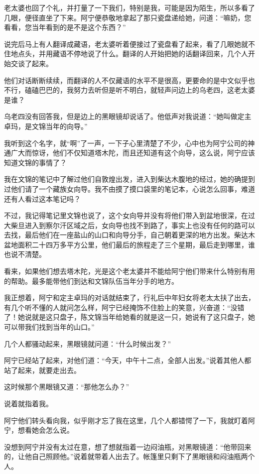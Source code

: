老太婆也回了个礼，并打量了一下我们，特别是我，可能是因为陌生，所以多看了几眼，便径直坐了下来。阿宁便恭敬地拿起了那只瓷盘递给她，问道：“嘛奶，您看看，您当年看到的是不是这个东西？”

说完后马上有人翻译成藏语，老太婆听着便接过了瓷盘看了起来，看了几眼她就不住地点头，并用藏语不停地说了什么。翻译的人开始把她的话翻译回来，几个人开始交谈了起来。

他们对话断断续续，而翻译的人不仅藏语的水平不是很高，更要命的是中文似乎也不行，磕磕巴巴的，我努力去听但是听不明白，就轻声问边上的乌老四，这老太婆是谁？

乌老四没有回答我，但是边上的黑眼镜却说话了。他低声对我说道：“她叫做定主卓玛，是文锦当年的向导。”

我听到这个名字，就“啊”了一声，一下子心里清楚了不少，心中也为阿宁公司的神通广大而惊讶，他们不仅知道塔木陀，而且还知道有这个向导，这么说，阿宁应该知道文锦的事情了？

我在文锦的笔记中了解过他们自敦煌出发，进入到柴达木腹地的经过，她的确提到过他们请了一个藏族女向导。我不由摸了摸口袋里的笔记本，心说怎么回事，难道还有人看过这本笔记吗？

不过，我记得笔记里文锦也说了，这个女向导并没有将他们带入到盆地很深，在过大柴旦进入到察尔汗区域之后，女向导也找不到路了，事实上也没有任何的路可以去找，最后他们在一座盐山的山口和向导分手，自己朝着更深的地方出发。柴达木盆地面积二十四万多平方公里，他们最后的旅程走了三个星期，最后走到哪里，谁也说不清楚。

看来，如果他们想去塔木陀，光是这个老太婆并不能给阿宁他们带来什么特别有用的帮助。最多能带他们到达和文锦队伍当年分手的地方。

我正想着，阿宁和定主卓玛的对话就结束了，行礼后中年妇女将老太太扶了出去，有几个听不懂的人就问怎么样，阿宁已经掩饰不住脸上的笑意，兴奋道：“没错了！她说就是这只盘子，陈文锦当年给她看的就是这一只，她说有了这只盘子，她可以带我们找到当年的山口。”

几个人都骚动起来，黑眼镜就问道：“什么时候出发？”

阿宁已经站了起来，对他们道：“今天，中午十二点，全部人出发。”说着其他人都站了起来，就要走出去。

这时候那个黑眼镜又道：“那他怎么办？”

说着就指着我。

阿宁他们转头看向我，似乎刚才忘了我在这里，几个人都错愕了一下，我就盯着阿宁，想看她会怎么说。

没想到阿宁并没有太过在意，想了想就指着一边闷油瓶，对黑眼镜道：“他带回来的，让他自己照顾他。”说着就带着人出去了。帐篷里只剩下了黑眼镜和闷油瓶两个人。

